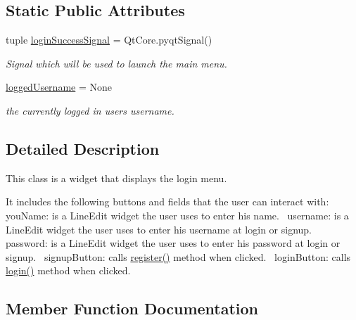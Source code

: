 \subsection*{Static Public Attributes}
\begin{DoxyCompactItemize}
\item 
tuple \hyperlink{classsrc_1_1login__menu_1_1_login_menu_a0c7d684b7c11fd92f8de9beee9cf2a9f}{login\+Success\+Signal} = Qt\+Core.\+pyqt\+Signal()
\begin{DoxyCompactList}\small\item\em Signal which will be used to launch the main menu. \end{DoxyCompactList}\item 
\hyperlink{classsrc_1_1login__menu_1_1_login_menu_a3c59b83a7a55f2334a015dfc722e86da}{logged\+Username} = None
\begin{DoxyCompactList}\small\item\em the currently logged in user\textquotesingle{}s username. \end{DoxyCompactList}\end{DoxyCompactItemize}


\subsection{Detailed Description}
This class is a widget that displays the login menu. 

It includes the following buttons and fields that the user can interact with\+:~\newline
you\+Name\+: is a Line\+Edit widget the user uses to enter his name.~\newline
username\+: is a Line\+Edit widget the user uses to enter his username at login or signup.~\newline
password\+: is a Line\+Edit widget the user uses to enter his password at login or signup.~\newline
signup\+Button\+: calls \hyperlink{classsrc_1_1login__menu_1_1_login_menu_af6ee6a8dee90f1a94a506400356707ad}{register()} method when clicked.~\newline
login\+Button\+: calls \hyperlink{classsrc_1_1login__menu_1_1_login_menu_a75303935e17e43388fd4ef3df029944e}{login()} method when clicked.~\newline
 

\subsection{Member Function Documentation}
\hypertarget{classsrc_1_1login__menu_1_1_login_menu_a5114077865bfc30e8adef2f90cd27d85}{}
